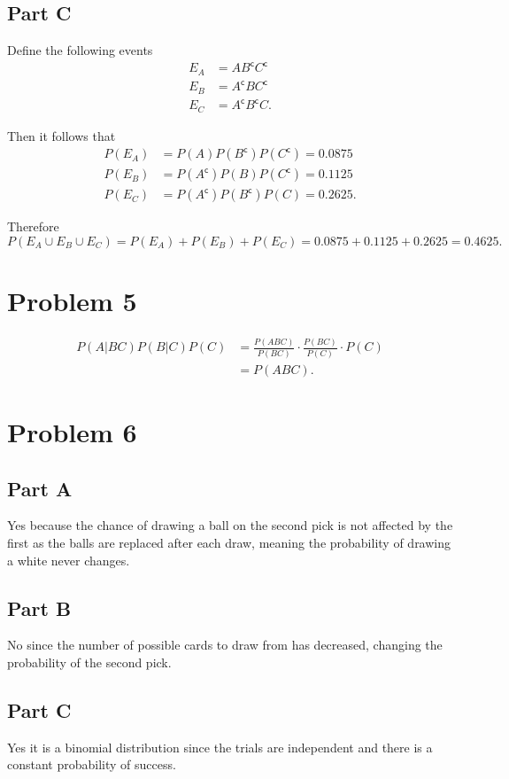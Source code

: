 \documentclass[12pt]{extarticle}
\renewcommand\complement{\mathsf{c}}
\begin{document}
\subsection*{Part C}
Define the following events
\begin{align*}
	E_A &= A B^\complement C^\complement \\
	E_B &= A^\complement B C^\complement \\
	E_C &= A^\complement B^\complement C
.\end{align*}

Then it follows that
\begin{align*}
	P(E_A) &= P(A) P(B^\complement) P(C^\complement) = 0.0875 \\
	P(E_B) &= P(A^\complement) P(B) P(C^\complement) = 0.1125 \\
	P(E_C) &= P(A^\complement) P(B^\complement) P(C) = 0.2625
.\end{align*}

Therefore
\[
	P(E_A \cup E_B \cup E_C) = P(E_A) + P(E_B) + P(E_C) = 0.0875 + 0.1125 + 0.2625 = 0.4625
.\]

\section*{Problem 5}
\begin{align*}
	P(A | BC) P(B|C) P(C) &= \frac{P(ABC)}{P(BC)} \cdot \frac{P(BC)}{P(C)} \cdot P(C) \\
	&= P(ABC)
.\end{align*}

\section*{Problem 6}
\subsection*{Part A}
Yes because the chance of drawing a ball on the second pick is not affected by the first as the balls are replaced after each draw, meaning the probability of drawing a white never changes.

\subsection*{Part B}
No since the number of possible cards to draw from has decreased, changing the probability of the second pick.

\subsection*{Part C}
Yes it is a binomial distribution since the trials are independent and there is a constant probability of success.
\end{document}
